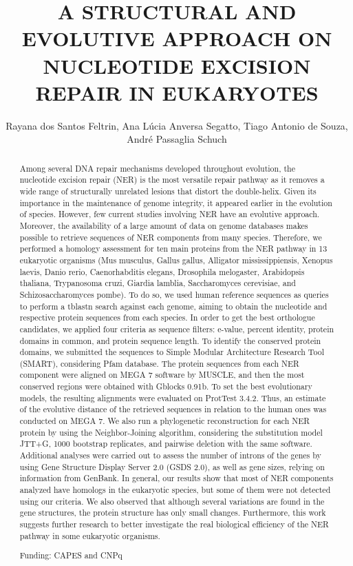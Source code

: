 \documentclass[twoside]{article}
\title{\vspace{-15mm}\fontsize{24pt}{10pt}\selectfont\textbf{ A STRUCTURAL AND EVOLUTIVE APPROACH ON NUCLEOTIDE EXCISION REPAIR IN EUKARYOTES }} %
\author{ Rayana dos Santos Feltrin, Ana L\'ucia Anversa Segatto, Tiago Antonio de Souza, Andr\'e Passaglia Schuch }
\affil{ Universidade Federal de Santa Maria }
\date{}
\begin{document}
  
  
  \maketitle %
  
  
  \thispagestyle{fancy} %
  
  
  \begin{abstract}
  Among several DNA repair mechanisms developed throughout evolution,  the nucleotide excision repair (NER) is the most versatile repair pathway as it removes a wide range of structurally unrelated lesions that distort the double-helix. Given its importance in the maintenance of genome integrity,  it appeared earlier in the evolution of species. However,  few current studies involving NER have an evolutive approach. Moreover,  the availability of a large amount of data on genome databases makes possible to retrieve sequences of NER components from many species. Therefore,  we performed a homology assessment for ten main proteins from the NER pathway in 13 eukaryotic organisms (Mus musculus,  Gallus gallus,  Alligator mississippiensis,  Xenopus laevis,  Danio rerio,  Caenorhabditis elegans,  Drosophila melogaster,  Arabidopsis thaliana,  Trypanosoma cruzi,  Giardia lamblia,  Saccharomyces cerevisiae,  and Schizosaccharomyces pombe). To do so,  we used human reference sequences as queries to perform a tblastn search against each genome,  aiming to obtain the nucleotide and respective protein sequences from each species. In order to get the best orthologue candidates,  we applied four criteria as sequence filters: e-value,  percent identity,  protein domains in common,  and protein sequence length. To identify the conserved protein domains,  we submitted the sequences to Simple Modular Architecture Research Tool (SMART),  considering Pfam database. The protein sequences from each NER component were aligned on MEGA 7 software by MUSCLE,  and then the most conserved regions were obtained with Gblocks 0.91b. To set the best evolutionary models,  the resulting alignments were evaluated on ProtTest 3.4.2. Thus,  an estimate of the evolutive distance of the retrieved sequences in relation to the human ones was conducted on MEGA 7. We also run a phylogenetic reconstruction for each NER protein by using the Neighbor-Joining algorithm,  considering the substitution model JTT+G,  1000 bootstrap replicates,  and pairwise deletion with the same software. Additional analyses were carried out to assess the number of introns of the genes by using Gene Structure Display Server 2.0 (GSDS 2.0),  as well as gene sizes,  relying on information from GenBank. In general,  our results show that most of NER components analyzed have homologs in the eukaryotic species,  but some of them were not detected using our criteria. We also observed that although several variations are found in the gene structures,  the protein structure has only small changes. Furthermore,  this work suggests further research to better investigate the real biological efficiency of the NER pathway in some eukaryotic organisms.
  
  Funding: CAPES and CNPq \\ 
  \end{abstract}
  
\end{document}
